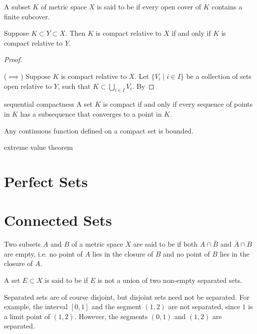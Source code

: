 \begin{definition}[Compactness]
A subset $K$ of metric space $X$ is said to be  if every open cover of $K$ contains a finite subcover.
\end{definition}

\begin{proposition}
Suppose $K\subset Y\subset X$. Then $K$ is compact relative to $X$ if and only if $K$ is compact relative to $Y$.
\end{proposition}

\begin{proof} \

($\implies$) Suppose $K$ is compact relative to $X$. Let $\{V_i\mid i\in I\}$ be a collection of sets open relative to $Y$, such that $K\subset\bigcup_{i\in I}V_i$. By 
\end{proof}

sequential compactness
A set $K$ is compact if and only if every sequence of points in $K$ has a subsequence that converges to a point in $K$.

Any continuous function defined on a compact set is bounded.

extreme value theorem

\section{Perfect Sets}


\section{Connected Sets}
\begin{definition}
Two subsets $A$ and $B$ of a metric space $X$ are said to be  if both $A\cap\bar{B}$ and $\bar{A}\cap B$ are empty, i.e. no point of $A$ lies in the closure of $B$ and no point of $B$ lies in the closure of $A$.

A set $E\subset X$ is said to be  if $E$ is not a union of two non-empty separated sets. 
\end{definition}

\begin{remark}
Separated sets are of course disjoint, but disjoint sets need not be separated. For example, the interval $[0,1]$ and the segment $(1,2)$ are not separated, since $1$ is a limit point of $(1,2)$. However, the segments $(0,1)$ and $(1,2)$ are separated.
\end{remark}

